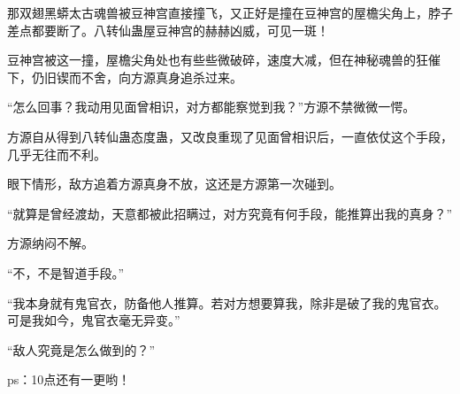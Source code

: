 \begin{this_body}
那双翅黑蟒太古魂兽被豆神宫直接撞飞，又正好是撞在豆神宫的屋檐尖角上，脖子差点都要断了。八转仙蛊屋豆神宫的赫赫凶威，可见一斑！

豆神宫被这一撞，屋檐尖角处也有些些微破碎，速度大减，但在神秘魂兽的狂催下，仍旧锲而不舍，向方源真身追杀过来。

“怎么回事？我动用见面曾相识，对方都能察觉到我？”方源不禁微微一愕。

方源自从得到八转仙蛊态度蛊，又改良重现了见面曾相识后，一直依仗这个手段，几乎无往而不利。

眼下情形，敌方追着方源真身不放，这还是方源第一次碰到。

“就算是曾经渡劫，天意都被此招瞒过，对方究竟有何手段，能推算出我的真身？”

方源纳闷不解。

“不，不是智道手段。”

“我本身就有鬼官衣，防备他人推算。若对方想要算我，除非是破了我的鬼官衣。可是我如今，鬼官衣毫无异变。”

“敌人究竟是怎么做到的？”

ps：10点还有一更哟！

\end{this_body}

